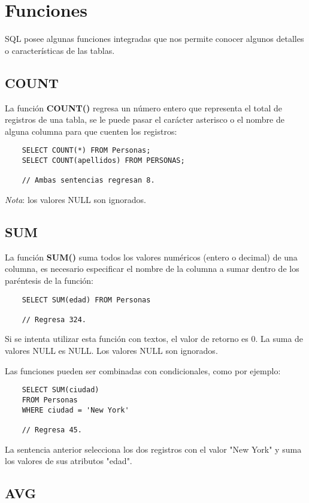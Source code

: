 \section{Funciones}

SQL posee algunas funciones integradas que nos permite conocer algunos detalles o características de las tablas.


\subsection{COUNT}

La función \textbf{COUNT()} regresa un número entero que representa el total de registros de una tabla, se le puede pasar el carácter asterisco o el nombre de alguna columna para que cuenten los registros:
\begin{lstlisting}
    SELECT COUNT(*) FROM Personas;
    SELECT COUNT(apellidos) FROM PERSONAS;

    // Ambas sentencias regresan 8.
\end{lstlisting}

\textit{Nota}: los valores NULL son ignorados.


\subsection{SUM}

La función \textbf{SUM()} suma todos los valores numéricos (entero o decimal) de una columna, es necesario especificar el nombre de la columna a sumar dentro de los paréntesis de la función:
\begin{lstlisting}
    SELECT SUM(edad) FROM Personas

    // Regresa 324.
\end{lstlisting}

Si se intenta utilizar esta función con textos, el valor de retorno es 0. La suma de valores NULL es NULL. Los valores NULL son ignorados.

Las funciones pueden ser combinadas con condicionales, como por ejemplo:
\begin{lstlisting}
    SELECT SUM(ciudad)
    FROM Personas
    WHERE ciudad = 'New York'

    // Regresa 45.
\end{lstlisting}

La sentencia anterior selecciona los dos registros con el valor "New York" y suma los valores de sus atributos "edad".


\subsection{AVG}

